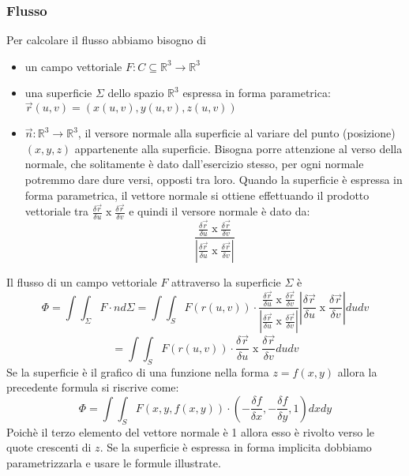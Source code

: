 \subsubsection{Flusso}
Per calcolare il flusso abbiamo bisogno di
\begin{itemize}
    \item un campo vettoriale $F: C \subseteq \mathbb{R}^3 \rightarrow  \mathbb{R}^3$
    \item una superficie $\Sigma$ dello spazio $\mathbb{R}^3$ espressa in forma parametrica: $\vec{r}(u,v)  = (x(u,v), y(u,v), z(u,v))$
    \item $\vec{n}: \mathbb{R}^3 \rightarrow  \mathbb{R}^3$, il versore normale alla superficie al variare del punto (posizione) $(x,y,z)$ appartenente alla superficie. Bisogna porre attenzione al verso della normale, che solitamente è dato dall'esercizio stesso, per ogni normale potremmo dare dure versi, opposti tra loro. Quando la superficie è espressa in forma parametrica, il vettore normale si ottiene effettuando il prodotto vettoriale tra $\frac{\delta \vec{r}}{\delta u} \; \text{x}\;\frac{\delta \vec{r}}{\delta v}$ e quindi il versore normale è dato da:
    \[
        \frac{\frac{\delta \vec{r}}{\delta u} \; \text{x}\;\frac{\delta \vec{r}}{\delta v}}{\left|\frac{\delta \vec{r}}{\delta u} \; \text{x}\;\frac{\delta \vec{r}}{\delta v}\right|}
    \]
\end{itemize}
Il flusso di un campo vettoriale $F$ attraverso la superficie $\Sigma$ è
\[
    \Phi = \int \int_{\Sigma}F \cdot n d\Sigma = \int \int_S F(r(u,v)) \cdot \frac{\frac{\delta \vec{r}}{\delta u} \; \text{x}\;\frac{\delta \vec{r}}{\delta v}}{\left|\frac{\delta \vec{r}}{\delta u} \; \text{x}\;\frac{\delta \vec{r}}{\delta v}\right|} \left|\frac{\delta \vec{r}}{\delta u} \; \text{x}\;\frac{\delta \vec{r}}{\delta v}\right| du dv
\]
\[
    = \int \int_S F(r(u,v)) \cdot \frac{\delta \vec{r}}{\delta u} \; \text{x}\;\frac{\delta \vec{r}}{\delta v} du dv
\]
\newline
Se la superficie è il grafico di una funzione nella forma $z = f(x,y)$ allora la precedente formula si riscrive come:
\[
    \Phi = \int \int_S F(x,y,f(x,y)) \cdot \left( -\frac{\delta f}{\delta x}, -\frac{\delta f}{\delta y}, 1 \right) dx dy
\]
Poichè il terzo elemento del vettore normale è 1 allora esso è rivolto verso le quote crescenti di $z$.\newline
\newline
Se la superficie è espressa in forma implicita dobbiamo parametrizzarla e usare le formule illustrate.
